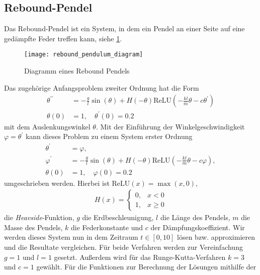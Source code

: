 \subsection{Rebound-Pendel}
\label{subsec:rebound-Pendel}
Das Rebound-Pendel \cite[6-7]{flamantSolvingDifferentialEquations2020} ist ein System, in dem ein Pendel an einer
Seite auf eine gedämpfte Feder treffen kann, siehe \ref{fig:rebound_pendulum_diagram}.
\begin{figure}
       \centering
       \texttt{[image: rebound\_pendulum\_diagram]}
       \caption{Diagramm eines Rebound Pendels\cite[6]{flamantSolvingDifferentialEquations2020}}
       \label{fig:rebound_pendulum_diagram}
\end{figure}
Das zugehörige Anfangsproblem zweiter Ordnung hat die Form
\begin{align*}
       \theta^{\prime \prime} &= - \frac{g}{l} \sin(\theta) + H(-\theta)
       \text{ReLU}(-\frac{kl}{m}\theta - c \theta^{\prime})\\
       \theta(0) &= 1, \quad \theta^{\prime}(0)=0.2
\end{align*}
mit dem Auslenkungswinkel $\theta$. Mit der Einführung der Winkelgeschwindigkeit $\varphi=\theta^{\prime}$ kann dieses
Problem zu einem System erster Ordnung
\begin{align}
       \theta^{\prime} &= \varphi, \nonumber \\
       \varphi^{\prime} &= - \frac{g}{l} \sin(\theta) + H(-\theta)
       \text{ReLU}(-\frac{kl}{m}\theta - c \varphi), \label{rebound-pendulum}\\
       \theta(0) &= 1, \quad \varphi(0)=0.2 \nonumber
\end{align}
umgeschrieben werden. Hierbei ist $\text{ReLU}(x)= \max(x, 0)$,
\begin{align*}
       H(x) =
       \begin{cases}
              0, &x<0 \\
              1, &x \geq 0
       \end{cases}
\end{align*}
die \textit{Heavside}-Funktion,
$g$ die Erdbeschleunigung, $l$ die Länge des Pendels, $m$ die Masse des Pendels, $k$ die Federkonstante und $c$ der
Dämpfungskoeffizient. Wir werden dieses System nun in dem Zeitraum $t \in [0, 10]$ lösen bzw. approximieren und die
Resultate vergleichen. Für beide Verfahren werden zur Vereinfachung $g=1$ und $l=1$ gesetzt. Außerdem wird für das
Runge-Kutta-Verfahren $k=3$ und $c=1$ gewählt. Für die Funktionen zur Berechnung der Lösungen mithilfe der
